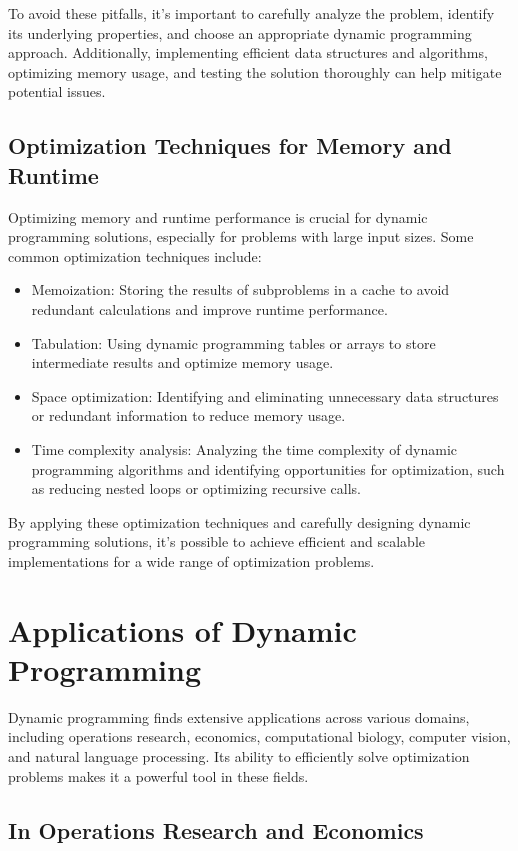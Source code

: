 \documentclass[12pt]{book} %
\begin{document}
To avoid these pitfalls, it's important to carefully analyze the problem, identify its underlying properties, and choose an appropriate dynamic programming approach. Additionally, implementing efficient data structures and algorithms, optimizing memory usage, and testing the solution thoroughly can help mitigate potential issues.

\subsection{Optimization Techniques for Memory and Runtime}

Optimizing memory and runtime performance is crucial for dynamic programming solutions, especially for problems with large input sizes. Some common optimization techniques include:

\begin{itemize}
    \item Memoization: Storing the results of subproblems in a cache to avoid redundant calculations and improve runtime performance.
    \item Tabulation: Using dynamic programming tables or arrays to store intermediate results and optimize memory usage.
    \item Space optimization: Identifying and eliminating unnecessary data structures or redundant information to reduce memory usage.
    \item Time complexity analysis: Analyzing the time complexity of dynamic programming algorithms and identifying opportunities for optimization, such as reducing nested loops or optimizing recursive calls.
\end{itemize}

By applying these optimization techniques and carefully designing dynamic programming solutions, it's possible to achieve efficient and scalable implementations for a wide range of optimization problems.


\section{Applications of Dynamic Programming}

Dynamic programming finds extensive applications across various domains, including operations research, economics, computational biology, computer vision, and natural language processing. Its ability to efficiently solve optimization problems makes it a powerful tool in these fields.

\subsection{In Operations Research and Economics}
\end{document}
